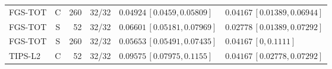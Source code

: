 \documentclass[10pt,a4paper]{article}
\begin{document}
\begin{longtable}{lcrcp{44mm}p{44mm}}
FGS-TOT & C & 260 & 32/32 & \(0.04924\,[0.0459,0.05809]\) & \(0.04167\,[0.01389,0.06944]\)\\
FGS-TOT & S & 52 & 32/32 & \(0.06601\,[0.05181,0.07969]\) & \(0.02778\,[0.01389,0.07292]\)\\
FGS-TOT & S & 260 & 32/32 & \(0.05653\,[0.05491,0.07435]\) & \(0.04167\,[0,0.1111]\)\\
TIPS-L2 & C & 52 & 32/32 & \(0.09575\,[0.07975,0.1155]\) & \(0.04167\,[0.02778,0.07292]\)\\

\end{longtable}
\end{document}
